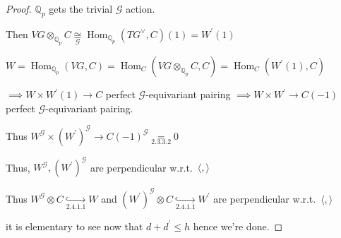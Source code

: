 \documentclass{article}
\theoremstyle{definition}
\numberwithin{theorem}{subsection}
\begin{document}
\begin{proof}
        \(\mathbb{Q}_p\) gets the trivial \(\mathscr{G}\) action.

        Then \(VG \otimes_{\mathbb{Q}_p} C \underset{\mathscr{G}}{\cong} \operatorname{Hom}_{\mathbb{Q}_p}(TG^\vee, C)(1) = W^{\prime}(1)\) 

        \(W = \operatorname{Hom}_{\mathbb{Q}_p}(VG,C) = \operatorname{Hom}_C (VG \otimes_{\mathbb{Q}_p} C, C) = \operatorname{Hom}_C (W^{\prime}(1), C)\) 

        \(\implies W \times W^{\prime}(1) \to C\) perfect \(\mathscr{G}\)-equivariant pairing \(\implies W \times W^{\prime} \to C(-1)\) perfect \(\mathscr{G}\)-equivariant pairing.

        Thus \(W^{\mathscr{G}} \times (W^{\prime})^{\mathscr{G}} \to C(-1)^{\mathscr{G}} \underset{2.3.3.2}{=} 0\)
        
        Thus, \(W^{\mathscr{G}}, (W^{\prime})^{\mathscr{G}}\) are perpendicular w.r.t.\ \(\langle , \rangle\) 

        Thus \(W^{\mathscr{G}} \otimes C \underset{2.4.1.1}{\hookrightarrow} W\) and \((W^{\prime})^{\mathscr{G}} \otimes C \underset{2.4.1.1}{\hookrightarrow} W^{\prime}\) are perpendicular w.r.t.\ \(\langle , \rangle\)

        it is elementary to see now that \(d + d^{\prime} \leq h\) hence we're done.

    \end{proof}
\end{document}
